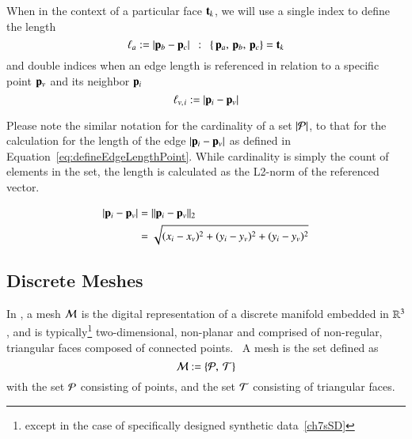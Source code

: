When in the context of a particular face $\mathbf{t}_k$, we will use a single index to define the length
%
\begin{equation}
	\ell_a := |\mathbf{p}_b - \mathbf{p}_c| \enspace:\enspace \left \{\,\mathbf{p}_a,\,\mathbf{p}_b,\,\mathbf{p}_c\right \} = \mathbf{t}_k
	\label{eq:defineEdgeLengthFace}
\end{equation}%
%
%
and double indices when an edge length is referenced in relation to a specific point $\mathbf{p}_v$ and its neighbor $\mathbf{p}_i$
%
\begin{equation}
	\ell_{v,\kern.75pt i} := |\mathbf{p}_i - \mathbf{p}_v|
	\label{eq:defineEdgeLengthPoint}
\end{equation}%
%

Please note the similar notation for the cardinality of a set $|\mathcal{P}|$, to that for the calculation for the length of the edge $|\mathbf{p}_i - \mathbf{p}_v|$ as defined in Equation~\ref{eq:defineEdgeLengthPoint}. While cardinality is simply the count of elements in the set, the length is calculated as the L2-norm of the referenced vector.~\cite[p.~26]{Mara12}

\begin{equation}
\begin{aligned}
	|\mathbf{p}_i - \mathbf{p}_v| & = \lVert\mathbf{p}_i - \mathbf{p}_v\rVert_2 \\
					& = \sqrt{(x_i-x_v)^2 + (y_i-y_v)^2 + (y_i-y_v)^2}
	\label{eq:defineEdgeLengthCalc}
\end{aligned}
\end{equation}

%
%
%
%
\subsection{Discrete Meshes}
\label{ch2sTDDssDM}
In \tdd{}, a mesh $\mathcal{M}$ is the digital representation of a discrete manifold embedded in $\mathbb{R}^{3}$, and is typically\footnote{except in the case of specifically designed synthetic data~\ref{ch7sSD}} two-dimensional, non-planar and comprised of non-regular, triangular faces composed of connected points.~\cite[p.~25]{Mara12} A mesh is the set defined as
%
\begin{equation}
	\mathcal{M} := \left \{\mathcal{P},\:\mathcal{T}\right \}
	\label{eq:defineMesh}
\end{equation}%
%
%
with the set $\mathcal{P}$ consisting of points, and the set $\mathcal{T}$ consisting of triangular faces.

